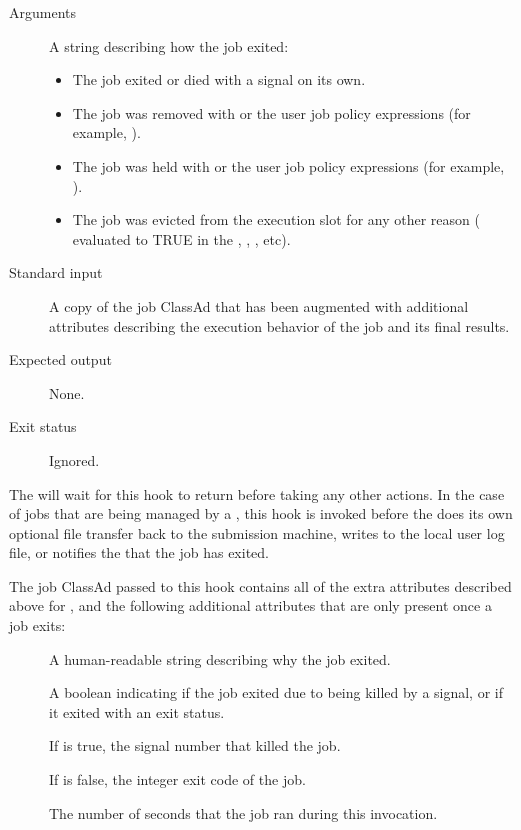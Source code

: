 \begin{description}
\item[Arguments]
  A string describing how the job exited:
  \begin{itemize}
    \item \verb@exit@ The job exited or died with a signal on its own.
    \item \verb@remove@ The job was removed with  or the
    user job policy expressions (for example, ).
    \item \verb@hold@ The job was held with  or the
    user job policy expressions (for example, ).
    \item \verb@evict@ The job was evicted from the execution slot for
    any other reason ( evaluated to TRUE in the
    , , , etc).
  \end{itemize}

\item[Standard input]
  A copy of the job ClassAd that has been augmented with additional
  attributes describing the execution behavior of the job and its
  final results.

\item[Expected output]
  None.

\item[Exit status]
  Ignored.
\end{description}

The  will wait for this hook to return before
taking any other actions.
In the case of jobs that are being managed by a , this
hook is invoked before the  does its own optional file
transfer back to the submission machine, writes to the local user log
file, or notifies the  that the job has exited.

The job ClassAd passed to this hook contains all of the extra
attributes described above for , and
the following additional attributes that are only present once a job
exits:
\begin{description}
\item[]
  A human-readable string describing why the job exited.

\item[]
  A boolean indicating if the job exited due to being killed by a
  signal, or if it exited with an exit status.

\item[]
  If  is true, the signal number that killed the job.

\item[]
  If  is false, the integer exit code of the job.

\item[]
  The number of seconds that the job ran during this invocation.
\end{description}

